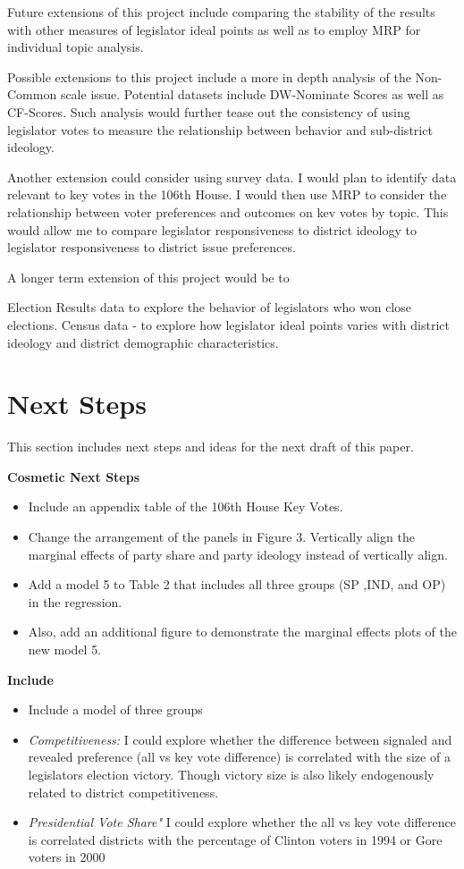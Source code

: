 \documentclass[10pt,letterpaper]{article}
\begin{document}
Future extensions of this project include comparing the stability of the results with other measures of legislator ideal points as well as to employ MRP for individual topic analysis.

Possible extensions to this project include a more in depth analysis of the Non-Common scale issue. Potential datasets include DW-Nominate Scores as well as CF-Scores. Such analysis would further tease out the consistency of using legislator votes to measure the relationship between behavior and sub-district ideology.

Another extension could consider using survey data. I would plan to identify data relevant to key votes in the 106th House. I would then use MRP to consider the relationship between voter preferences and outcomes on kev votes by topic. This would allow me to compare legislator responsiveness to district ideology to legislator responsiveness to district issue preferences.


A longer term extension of this project would be to 

Election Results data to explore the behavior of legislators who won close elections.
Census data - to explore how legislator ideal points varies with district ideology and district demographic characteristics. 

\section{Next Steps} 

This section includes next steps and ideas for the next draft of this paper.

\textbf{Cosmetic Next Steps}
\begin{itemize}
\item Include an appendix table of the 106th House Key Votes.
\item Change the arrangement of the panels in Figure 3. Vertically align the marginal effects of party share and party ideology instead of vertically align.
\item Add a model 5 to Table 2 that includes all three groups (SP ,IND, and OP) in the regression.
\item Also, add an additional figure to demonstrate the marginal effects plots of the new model 5.
\end{itemize}

\textbf{Include}
\begin{itemize}
\item Include a model of three groups
\item \textit{Competitiveness:} I could explore whether the difference between signaled and revealed preference (all vs key vote difference) is correlated with the size of a legislators election victory. Though victory size is also likely endogenously related to district competitiveness.
\item \textit{Presidential Vote Share"} I could explore whether the 
all vs key vote difference is correlated districts with the percentage of Clinton voters in 1994 or Gore voters in 2000 
\end{itemize}
\end{document}
